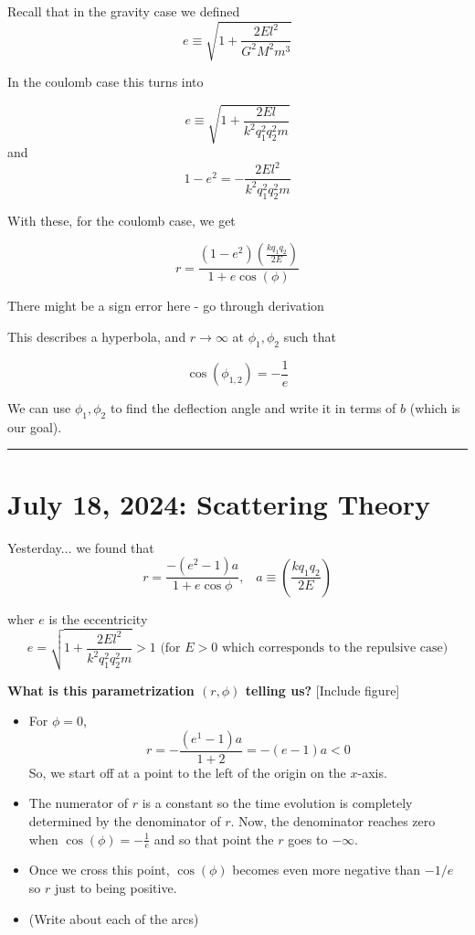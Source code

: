 \documentclass[11pt]{article}
\begin{document}
Recall that in the gravity case we defined 
\[ e \equiv \sqrt{1 + \frac{2E l^2}{G^2 M^2 m^3}} \]


In the coulomb case this turns into 

\[ e \equiv \sqrt{1 + \frac{2El}{k^2 q_1^2 q_2^2 m}} \]
and 
\[ 1 - e^2 = -\frac{2E l^2}{k^2 q_1^2 q_2^2 m} \]

With these, for the coulomb case, we get 

\[ \boxed{r = \frac{(1-e^2) \left(\frac{kq_1 q_2}{2E}\right) }{1+e\cos(\phi)} } \]

\begin{note}
  {There might be a sign error here - go through derivation}
\end{note}

This describes a hyperbola, and $r \rightarrow \infty$ at $\phi_1, \phi_2$ such that 

\[ \cos(\phi_{1,2}) = -\frac{1}{e}  \]

We can use $\phi_1, \phi_2$ to find the deflection angle and write it in terms of $b$ (which is our goal).
\hrule

\pagebreak
\section{July 18, 2024: Scattering Theory}

\vskip 1cm
Yesterday... we found that 
\[ r = \frac{-(e^2 - 1) a}{1 + e\cos\phi},\;\;\; a \equiv \left(\frac{kq_1 q_2}{2E}\right) \]

wher $e$ is the eccentricity
\[ e = \sqrt{1 + \frac{2El^2}{k^2 q_1^2 q_2^2 m}} > 1 \text{ (for $E > 0$ which corresponds to the repulsive case)}\]

\textbf{What is this parametrization $(r, \phi)$ telling us?
}
\vskip 0.5cm
[Include figure]
\vskip 0.5cm

\begin{itemize}
  \item For $\phi = 0$, 
  \[ r = - \frac{(e^1 - 1)a}{1 + 2} = -(e-1)a < 0 \]
  So, we start off at a point to the left of the origin on the $x$-axis. 

  \item The numerator of $r$ is a constant so the time evolution is completely determined by the denominator of $r$. Now, the denominator reaches zero when $\cos(\phi) = -\frac{1}{e}$ and so that point the $r$ goes to $-\infty$.
  
  \item Once we cross this point, $\cos(\phi)$ becomes even more negative than $-1/e$ so $r$ just to being positive.
  
  \item (Write about each of the arcs)
\end{itemize}
\end{document}
